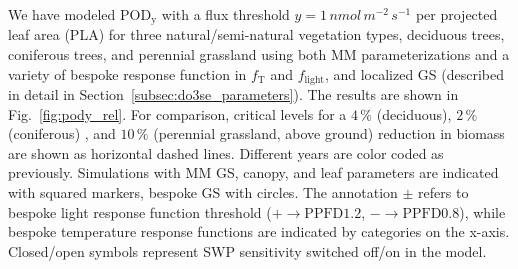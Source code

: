 \documentclass[bg, manuscript]{copernicus}
\begin{document}
We have modeled $\mathrm{POD_y}$ with a flux threshold $y=1\,\unit{nmol\,m^{-2}\,s^{-1}}$ per projected leaf area (PLA) for three natural/semi-natural vegetation types, deciduous trees, coniferous trees, and perennial grassland using both MM parameterizations and a variety of bespoke response function in $f_\mathrm{T}$ and $f_\mathrm{light}$, and localized GS (described in detail in Section~\ref{subsec:do3se_parameters}). The results are shown in Fig.~\ref{fig:pody_rel}. For comparison, critical levels for a $4\,\unit{\%}$ (deciduous), $2\,\unit{\%}$ (coniferous) \citep[refer to silver birch and Norway spruce in][]{ICP:MappingManual2017}, and $10\,\unit{\%}$ (perennial grassland, above ground) \citep{ESPR:Hayes2021} reduction in biomass are shown as horizontal dashed lines. Different years are color coded as previously. Simulations with MM GS, canopy, and leaf parameters are indicated with squared markers, bespoke GS with circles. The annotation $\pm$ refers to bespoke light response function threshold ($+\rightarrow\mathrm{PPFD1.2}$, $-\rightarrow\mathrm{PPFD0.8}$), while bespoke temperature response functions are indicated by categories on the x-axis. Closed/open symbols represent SWP sensitivity switched off/on in the model.
\end{document}
